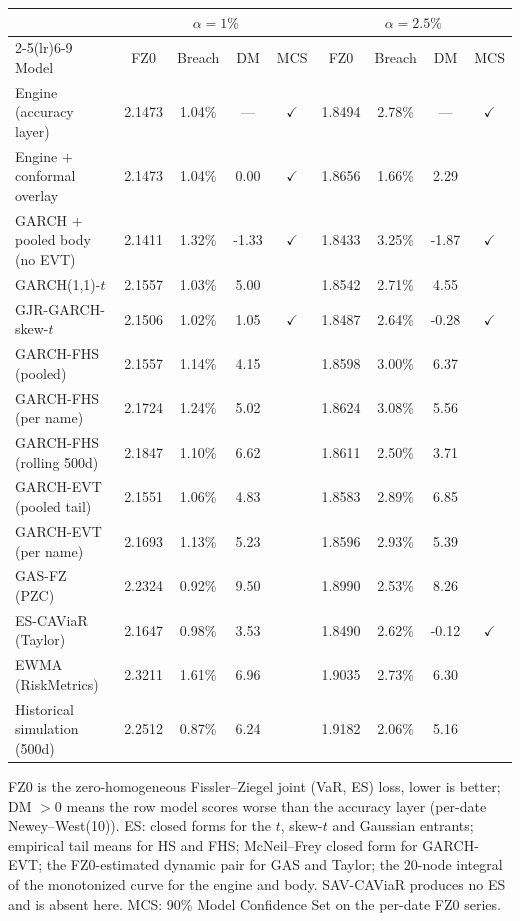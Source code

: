 \begin{tabular}{lcccccccc}
\toprule
& \multicolumn{4}{c}{$\alpha=1\%$} & \multicolumn{4}{c}{$\alpha=2.5\%$} \\
\cmidrule(lr){2-5}\cmidrule(lr){6-9}
Model & FZ0 & Breach & DM & MCS & FZ0 & Breach & DM & MCS \\
\midrule
Engine (accuracy layer) & 2.1473 & 1.04\% & --- & $\checkmark$ & 1.8494 & 2.78\% & --- & $\checkmark$ \\
Engine $+$ conformal overlay & 2.1473 & 1.04\% & 0.00 & $\checkmark$ & 1.8656 & 1.66\% & 2.29 &  \\
GARCH $+$ pooled body (no EVT) & 2.1411 & 1.32\% & -1.33 & $\checkmark$ & 1.8433 & 3.25\% & -1.87 & $\checkmark$ \\
GARCH(1,1)-$t$ & 2.1557 & 1.03\% & 5.00 &  & 1.8542 & 2.71\% & 4.55 &  \\
GJR-GARCH-skew-$t$ & 2.1506 & 1.02\% & 1.05 & $\checkmark$ & 1.8487 & 2.64\% & -0.28 & $\checkmark$ \\
GARCH-FHS (pooled) & 2.1557 & 1.14\% & 4.15 &  & 1.8598 & 3.00\% & 6.37 &  \\
GARCH-FHS (per name) & 2.1724 & 1.24\% & 5.02 &  & 1.8624 & 3.08\% & 5.56 &  \\
GARCH-FHS (rolling 500d) & 2.1847 & 1.10\% & 6.62 &  & 1.8611 & 2.50\% & 3.71 &  \\
GARCH-EVT (pooled tail) & 2.1551 & 1.06\% & 4.83 &  & 1.8583 & 2.89\% & 6.85 &  \\
GARCH-EVT (per name) & 2.1693 & 1.13\% & 5.23 &  & 1.8596 & 2.93\% & 5.39 &  \\
GAS-FZ (PZC) & 2.2324 & 0.92\% & 9.50 &  & 1.8990 & 2.53\% & 8.26 &  \\
ES-CAViaR (Taylor) & 2.1647 & 0.98\% & 3.53 &  & 1.8490 & 2.62\% & -0.12 & $\checkmark$ \\
EWMA (RiskMetrics) & 2.3211 & 1.61\% & 6.96 &  & 1.9035 & 2.73\% & 6.30 &  \\
Historical simulation (500d) & 2.2512 & 0.87\% & 6.24 &  & 1.9182 & 2.06\% & 5.16 &  \\
\bottomrule
\end{tabular}
\begin{tablenotes}\footnotesize
\item FZ0 is the zero-homogeneous Fissler--Ziegel joint (VaR, ES) loss, lower is better; DM $>0$ means the row model scores worse than the accuracy layer (per-date Newey--West(10)). ES: closed forms for the $t$, skew-$t$ and Gaussian entrants; empirical tail means for HS and FHS; McNeil--Frey closed form for GARCH-EVT; the FZ0-estimated dynamic pair for GAS and Taylor; the 20-node integral of the monotonized curve for the engine and body. SAV-CAViaR produces no ES and is absent here. MCS: 90\% Model Confidence Set on the per-date FZ0 series.
\end{tablenotes}
